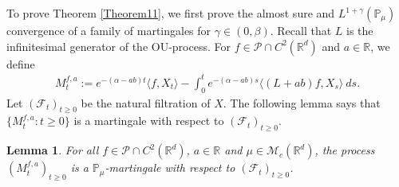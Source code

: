 \documentclass[12pt,a4paper]{amsart}
\theoremstyle{plain}
\newtheorem{lem}[thm]{Lemma}
\theoremstyle{definition}
\numberwithin{equation}{section}
\begin{document}
To prove Theorem \ref{Theorem11}, we first prove the almost sure and $L^{1+\gamma}(\mathbb{P}_{\mu})$ convergence of a family of martingales for $\gamma\in (0, \beta)$. Recall that $L$ is the infinitesimal generator of the OU-process.  For $f\in \mathcal{P}\cap C^2(\mathbb R^d)$ and  $a\in \mathbb R$, we define 
\begin{equation}\begin{split}
\label{defmartingale}
    M_t^{f,a}:=e^{-(\alpha-ab)t}\langle f,X_t\rangle-\int_0^t e^{-(\alpha-ab)s}\langle (L+ab)f, X_s\rangle~ ds.
\end{split}\end{equation}
Let $(\mathscr{F}_t)_{t\geq 0}$ be the natural filtration of $X$.  The following lemma says that $\{M_t^{f,a}: t\geq 0\}$ is a martingale with respect to $(\mathscr{F}_t)_{t\geq 0}$.
\begin{lem}
\label{lemma25}
    For all $f\in \mathcal{P}\cap C^2(\mathbb R^d)$, $a\in \mathbb R$
and $\mu\in \mathcal M_c(\mathbb R^d)$, the process $(M_t^{f,a})_{t\geq 0}$ is a $\mathbb P_\mu$-martingale with respect to $(\mathscr F_t)_{t\geq 0}$.
\end{lem}
\end{document}

